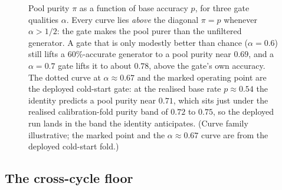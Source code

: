 \begin{figure}[htbp]
\centering
{}
\caption[The purity identity]{Pool purity $\pi$ as a function of base accuracy $p$, for
three gate qualities $\alpha$. Every curve lies \emph{above} the diagonal $\pi = p$
whenever $\alpha > 1/2$: the gate makes the pool purer than the unfiltered generator. A
gate that is only modestly better than chance ($\alpha = 0.6$) still lifts a
$60\%$-accurate generator to a pool purity near $0.69$, and a $\alpha = 0.7$ gate lifts it
to about $0.78$, above the gate's own accuracy. The dotted curve at $\alpha \approx 0.67$
and the marked operating point are the deployed cold-start gate: at the realised base rate
$p \approx 0.54$ the identity predicts a pool purity near $0.71$, which sits just under the
realised calibration-fold purity band of $0.72$ to $0.75$, so the deployed run lands in the
band the identity anticipates. (Curve family illustrative; the marked point and the
$\alpha \approx 0.67$ curve are from the deployed cold-start fold.)}
\label{fig:purity}
\end{figure}

\subsection*{The cross-cycle floor}

